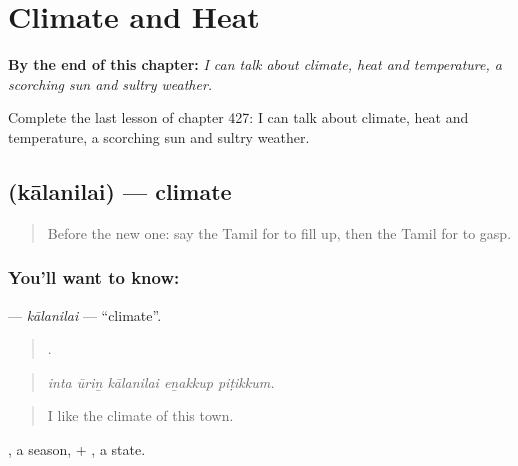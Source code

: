 
\chapter{Climate and Heat}
\label{ch:ta-climate-and-heat}

\begin{chapteropening}
\textbf{By the end of this chapter:} \emph{I can talk about climate, heat and temperature, a scorching sun and sultry weather.}

Complete the last lesson of chapter 427: I can talk about climate, heat and temperature, a scorching sun and sultry weather.
\end{chapteropening}

\section[\texorpdfstring{\ta{காலநிலை} (kālanilai)}{காலநிலை (kālanilai)}]{ (kālanilai) — climate}

\label{lesson:TA-C427-kalanilai}



\begin{quote}
Before the new one: say the Tamil for to fill up, then the Tamil for to gasp.
\end{quote}

\subsection*{You'll want to know: }
\textbf{} — \emph{kālanilai} — \textquotedblleft{}climate\textquotedblright{}.

\begin{quote}
    .
\end{quote}

\begin{quote}
\emph{inta ūriṉ kālanilai eṉakkup piṭikkum.}
\end{quote}

\begin{quote}
I like the climate of this town.
\end{quote}

, a season, + , a state.

